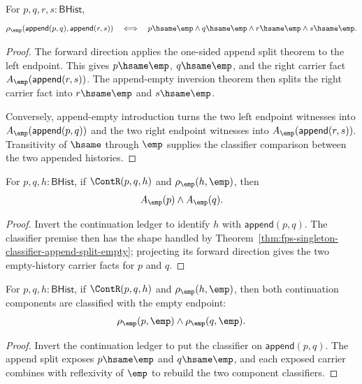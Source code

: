 \begin{theorem}
\label{thm:fps-singleton-classifier-append-pair-split-empty}
For $p,q,r,s:\mathsf{BHist}$,
$$
\rho_{\emp}(\mathsf{append}(p,q),\mathsf{append}(r,s))
\quad\Longleftrightarrow\quad
p\hsame\emp\land q\hsame\emp\land r\hsame\emp\land s\hsame\emp.
$$
\end{theorem}
\begin{proof}
The forward direction applies the one-sided append split theorem to the left
endpoint. This gives $p\hsame\emp$, $q\hsame\emp$, and the right carrier fact
$A_{\emp}(\mathsf{append}(r,s))$. The append-empty inversion theorem then
splits the right carrier fact into $r\hsame\emp$ and $s\hsame\emp$.

Conversely, append-empty introduction turns the two left endpoint witnesses
into $A_{\emp}(\mathsf{append}(p,q))$ and the two right endpoint witnesses into
$A_{\emp}(\mathsf{append}(r,s))$. Transitivity of $\hsame$ through $\emp$
supplies the classifier comparison between the two appended histories.
\end{proof}

\begin{theorem}
\label{thm:fps-singleton-empty-history-classifier-cont-split-empty}
For $p,q,h:\mathsf{BHist}$, if $\ContR(p,q,h)$ and
$\rho_{\emp}(h,\emp)$, then
$$
A_{\emp}(p)\land A_{\emp}(q).
$$
\end{theorem}
\begin{proof}
Invert the continuation ledger to identify $h$ with
$\mathsf{append}(p,q)$. The classifier premise then has the shape handled by
Theorem~\ref{thm:fps-singleton-classifier-append-split-empty}; projecting its
forward direction gives the two empty-history carrier facts for $p$ and $q$.
\end{proof}

\begin{theorem}
\label{thm:fps-singleton-empty-history-classifier-cont-component-classifiers}
For $p,q,h:\mathsf{BHist}$, if $\ContR(p,q,h)$ and
$\rho_{\emp}(h,\emp)$, then both continuation components are classified with
the empty endpoint:
$$
\rho_{\emp}(p,\emp)\land \rho_{\emp}(q,\emp).
$$
\end{theorem}
\begin{proof}
Invert the continuation ledger to put the classifier on
$\mathsf{append}(p,q)$. The append split exposes $p\hsame\emp$ and
$q\hsame\emp$, and each exposed carrier combines with reflexivity of $\emp$ to
rebuild the two component classifiers.
\end{proof}

